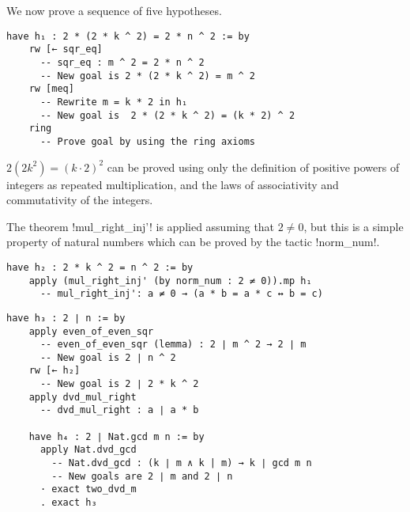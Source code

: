 
\begin{center}
\setlength{\fboxrule}{1pt}
\end{center}

We now prove a sequence of five hypotheses.
\begin{Verbatim}[firstnumber=last]
  have h₁ : 2 * (2 * k ^ 2) = 2 * n ^ 2 := by
    rw [← sqr_eq]
      -- sqr_eq : m ^ 2 = 2 * n ^ 2
      -- New goal is 2 * (2 * k ^ 2) = m ^ 2
    rw [meq]
      -- Rewrite m = k * 2 in h₁
      -- New goal is  2 * (2 * k ^ 2) = (k * 2) ^ 2
    ring
      -- Prove goal by using the ring axioms
\end{Verbatim}


$2(2k^2)=(k\cdot 2)^2$ can be proved using only the definition of positive powers of integers as repeated multiplication, and the laws of associativity and commutativity of the integers.

The theorem !mul_right_inj'! is applied assuming that $2\neq 0$, but this is a simple property of natural numbers which can be proved by the tactic !norm_num!.
\begin{Verbatim}[firstnumber=last]
  have h₂ : 2 * k ^ 2 = n ^ 2 := by
    apply (mul_right_inj' (by norm_num : 2 ≠ 0)).mp h₁
      -- mul_right_inj': a ≠ 0 → (a * b = a * c ↔ b = c)
\end{Verbatim}


\begin{Verbatim}[firstnumber=last]
  have h₃ : 2 ∣ n := by
    apply even_of_even_sqr
      -- even_of_even_sqr (lemma) : 2 ∣ m ^ 2 → 2 ∣ m
      -- New goal is 2 ∣ n ^ 2
    rw [← h₂]
      -- New goal is 2 ∣ 2 * k ^ 2
    apply dvd_mul_right
      -- dvd_mul_right : a ∣ a * b

    have h₄ : 2 ∣ Nat.gcd m n := by
      apply Nat.dvd_gcd
        -- Nat.dvd_gcd : (k ∣ m ∧ k | m) → k ∣ gcd m n
        -- New goals are 2 ∣ m and 2 ∣ n
      · exact two_dvd_m
      . exact h₃
\end{Verbatim}

